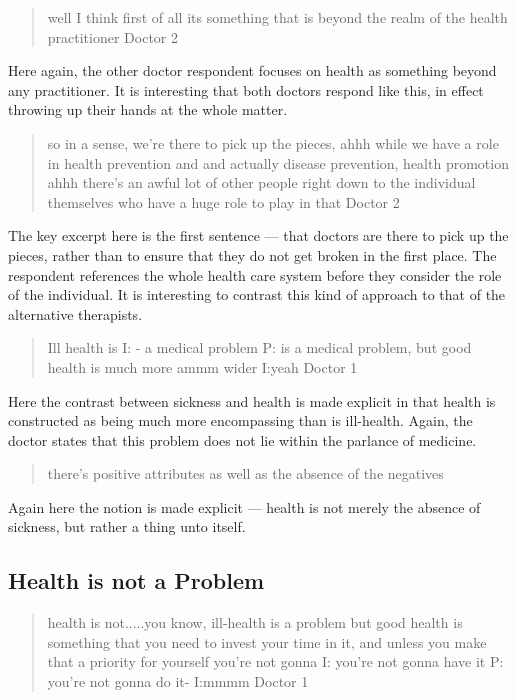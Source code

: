 \begin{quotation}
  well I think first of all its something that is beyond the realm of the health practitioner 
Doctor 2
\end{quotation}

Here again, the other doctor respondent focuses on health as something beyond any practitioner. It is interesting that both doctors respond like this, in effect throwing up their hands at the whole matter. 

\begin{quotation}
  so in a sense, we're there to pick up the pieces, ahhh while we have a role in health prevention and and actually disease prevention, health promotion ahhh there's an awful lot of other people right down to the individual themselves who have a huge role to play in that
Doctor 2
\end{quotation}

The key excerpt here is the first sentence --- that doctors are there to pick up the pieces, rather than to ensure that they do not get broken in  the first place. The respondent references the whole health care system before they consider the role of the individual. It is interesting to contrast this kind of approach to that of the alternative therapists. 

\begin{quotation}
  
Ill health is 
I: - a medical problem 
P: is a medical problem, but good health is much more ammm wider
I:yeah 
Doctor 1
\end{quotation}

Here the contrast between sickness and health is made explicit in that health is constructed as being much more encompassing than is ill-health. Again, the doctor states that this problem does not lie within the parlance of medicine. 

\begin{quotation}
  there's positive attributes as well as the absence of the negatives

\end{quotation}
Again here the notion is made explicit --- health is not merely the absence of sickness, but rather a thing unto itself. 

\subsection{Health is not a Problem}
\label{sec:health-not-problem}

\begin{quotation}
  health is not.....you know, ill-health is a problem but good health is something that you need to invest your time in it, and unless you make that a priority for yourself you're not gonna
I: you're not gonna have it
P: you're not gonna do it-
I:mmmm
Doctor 1
\end{quotation}


